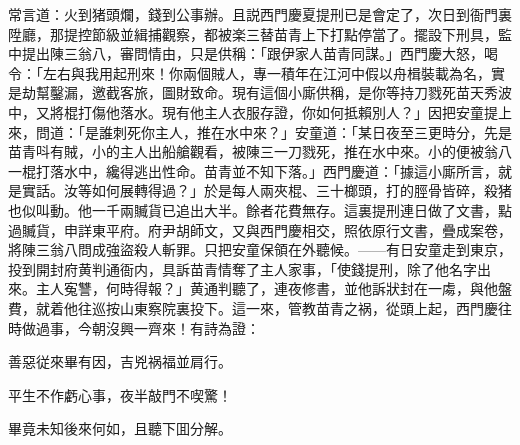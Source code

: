 常言道：火到猪頭爛，錢到公事辦。且説西門慶夏提刑已是會定了，次日到衙門裏陞廳，那提控節級並緝捕觀察，都被楽三替苗青上下打點停當了。擺設下刑具，監中提出陳三翁八，審問情由，只是供稱：「跟伊家人苗青同謀。」西門慶大怒，喝令：「左右與我用起刑來！你兩個賊人，專一積年在江河中假以舟楫裝載為名，實是劫幫鑿漏，邀截客旅，圖財致命。現有這個小廝供稱，是你等持刀戮死苗天秀波中，又將棍打傷他落水。現有他主人衣服存證，你如何抵賴別人？」因把安童提上來，問道：「是誰刺死你主人，推在水中來？」安童道：「某日夜至三更時分，先是苗青呌有賊，小的主人出船艙觀看，被陳三一刀戮死，推在水中來。小的便被翁八一棍打落水中，纔得逃出性命。苗青並不知下落。」西門慶道：「據這小廝所言，就是實話。汝等如何展轉得過？」於是每人兩夾棍、三十榔頭，打的脛骨皆碎，殺猪也似叫動。他一千兩贓貨已追出大半。餘者花費無存。這裏提刑連日做了文書，點過贓貨，申詳東平府。府尹胡師文，又與西門慶相交，照依原行文書，疊成案卷，將陳三翁八問成強盜殺人斬罪。只把安童保領在外聽候。——有日安童走到東京，投到開封府黄判通衙内，具訴苗青情奪了主人家事，「使錢提刑，除了他名字出來。主人寃讐，何時得報？」黄通判聽了，連夜修書，並他訴狀封在一䖏，與他盤費，就着他往巡按山東察院裏投下。這一來，管教苗青之祸，從頭上起，西門慶往時做過事，今朝沒興一齊來！有詩為證：

\begin{myquote}
善惡従來畢有因，吉兇祸福並肩行。

平生不作虧心事，夜半敲門不喫驚！
\end{myquote}

畢竟未知後來何如，且聽下囬分解。

